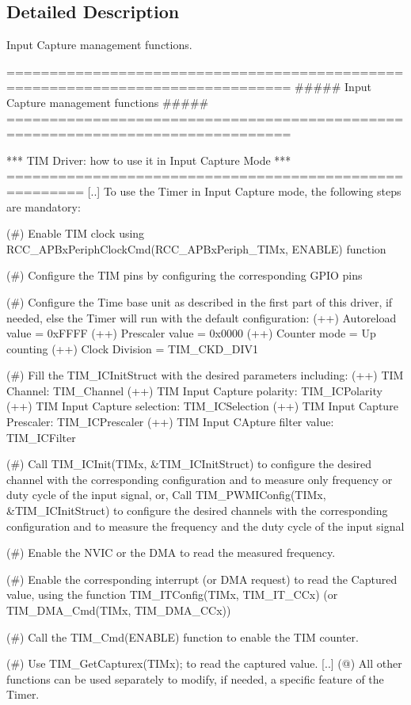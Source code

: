 \subsection{Detailed Description}
Input Capture management functions. \begin{DoxyVerb} ===============================================================================
               ##### Input Capture management functions #####
 ===============================================================================  
         
  *** TIM Driver: how to use it in Input Capture Mode ***
  =======================================================
  [..] 
  To use the Timer in Input Capture mode, the following steps are mandatory:
       
      (#) Enable TIM clock using RCC_APBxPeriphClockCmd(RCC_APBxPeriph_TIMx, ENABLE) function
       
      (#) Configure the TIM pins by configuring the corresponding GPIO pins
       
      (#) Configure the Time base unit as described in the first part of this driver,
          if needed, else the Timer will run with the default configuration:
          (++) Autoreload value = 0xFFFF
          (++) Prescaler value = 0x0000
          (++) Counter mode = Up counting
          (++) Clock Division = TIM_CKD_DIV1
          
      (#) Fill the TIM_ICInitStruct with the desired parameters including:
          (++) TIM Channel: TIM_Channel
          (++) TIM Input Capture polarity: TIM_ICPolarity
          (++) TIM Input Capture selection: TIM_ICSelection
          (++) TIM Input Capture Prescaler: TIM_ICPrescaler
          (++) TIM Input CApture filter value: TIM_ICFilter
       
      (#) Call TIM_ICInit(TIMx, &TIM_ICInitStruct) to configure the desired channel with the 
          corresponding configuration and to measure only frequency or duty cycle of the input signal,
          or,
          Call TIM_PWMIConfig(TIMx, &TIM_ICInitStruct) to configure the desired channels with the 
          corresponding configuration and to measure the frequency and the duty cycle of the input signal
          
      (#) Enable the NVIC or the DMA to read the measured frequency. 
          
      (#) Enable the corresponding interrupt (or DMA request) to read the Captured value,
          using the function TIM_ITConfig(TIMx, TIM_IT_CCx) (or TIM_DMA_Cmd(TIMx, TIM_DMA_CCx)) 
       
      (#) Call the TIM_Cmd(ENABLE) function to enable the TIM counter.
       
      (#) Use TIM_GetCapturex(TIMx); to read the captured value.
  [..]        
      (@) All other functions can be used separately to modify, if needed,
          a specific feature of the Timer. \end{DoxyVerb}


